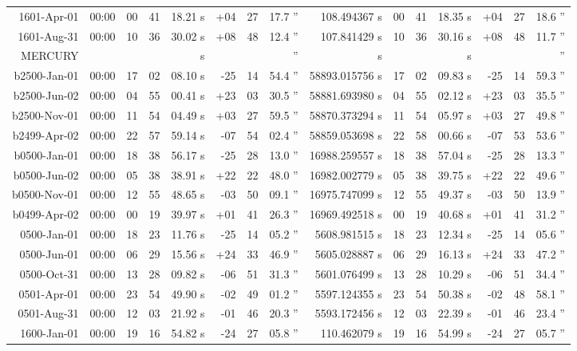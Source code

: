 \begin{longtable}{r@{\,}r|r@{h}r@{m}r<{s}|r@{°}r@{'}r<{''}|r<{s}||r@{h}r@{m}r<{s}|r@{°}r@{'}r<{''}}
 1601-Apr-01 &00:00   &  00 & 41 & 18.21 & +04 & 27 & 17.7  &   108.494367 & 00&41&18.35 & +04&27&18.6 \\ %
 1601-Aug-31 &00:00   &  10 & 36 & 30.02 & +08 & 48 & 12.4  &   107.841429 & 10&36&30.16 & +08&48&11.7 \\ %
MERCURY\\
b2500-Jan-01 &00:00   &  17 & 02 & 08.10 & -25 & 14 & 54.4  & 58893.015756 & 17&02&09.83 & -25&14&59.3 \\ %
b2500-Jun-02 &00:00   &  04 & 55 & 00.41 & +23 & 03 & 30.5  & 58881.693980 & 04&55&02.12 & +23&03&35.5 \\ %
b2500-Nov-01 &00:00   &  11 & 54 & 04.49 & +03 & 27 & 59.5  & 58870.373294 & 11&54&05.97 & +03&27&49.8 \\ %
b2499-Apr-02 &00:00   &  22 & 57 & 59.14 & -07 & 54 & 02.4  & 58859.053698 & 22&58&00.66 & -07&53&53.6 \\ %
b0500-Jan-01 &00:00   &  18 & 38 & 56.17 & -25 & 28 & 13.0  & 16988.259557 & 18&38&57.04 & -25&28&13.3 \\ %
b0500-Jun-02 &00:00   &  05 & 38 & 38.91 & +22 & 22 & 48.0  & 16982.002779 & 05&38&39.75 & +22&22&49.6 \\ %
b0500-Nov-01 &00:00   &  12 & 55 & 48.65 & -03 & 50 & 09.1  & 16975.747099 & 12&55&49.37 & -03&50&13.9 \\ %
b0499-Apr-02 &00:00   &  00 & 19 & 39.97 & +01 & 41 & 26.3  & 16969.492518 & 00&19&40.68 & +01&41&31.2 \\ %
 0500-Jan-01 &00:00   &  18 & 23 & 11.76 & -25 & 14 & 05.2  &  5608.981515 & 18&23&12.34 & -25&14&05.6 \\ %
 0500-Jun-01 &00:00   &  06 & 29 & 15.56 & +24 & 33 & 46.9  &  5605.028887 & 06&29&16.13 & +24&33&47.2 \\ %
 0500-Oct-31 &00:00   &  13 & 28 & 09.82 & -06 & 51 & 31.3  &  5601.076499 & 13&28&10.29 & -06&51&34.4 \\ %
 0501-Apr-01 &00:00   &  23 & 54 & 49.90 & -02 & 49 & 01.2  &  5597.124355 & 23&54&50.38 & -02&48&58.1 \\ %
 0501-Aug-31 &00:00   &  12 & 03 & 21.92 & -01 & 46 & 20.3  &  5593.172456 & 12&03&22.39 & -01&46&23.4 \\ %
 1600-Jan-01 &00:00   &  19 & 16 & 54.82 & -24 & 27 & 05.8  &   110.462079 & 19&16&54.99 & -24&27&05.7 \\ %

\end{longtable}
